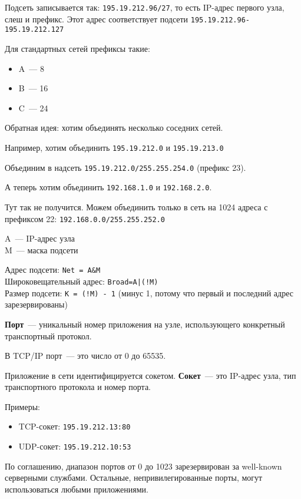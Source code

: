 Подсеть записывается так: {\tt 195.19.212.96/27}, то есть IP-адрес первого узла, слеш и префикс. Этот адрес соответствует подсети {\tt 195.19.212.96-195.19.212.127}

Для стандартных сетей префиксы такие:
\begin{itemize}
    \item A~--- 8
    \item B~--- 16
    \item C~--- 24
\end{itemize}


Обратная идея: хотим объединять несколько соседних сетей.

Например, хотим объединить {\tt 195.19.212.0} и {\tt 195.19.213.0}

Объединим в надсеть {\tt 195.19.212.0/255.255.254.0} (префикс 23).

А теперь хотим объединить {\tt 192.168.1.0} и {\tt 192.168.2.0}.

Тут так не получится. Можем объединить только в сеть на 1024 адреса с префиксом 22: {\tt 192.168.0.0/255.255.252.0}


A~--- IP-адрес узла\\
M~--- маска подсети

Адрес подсети: {\tt Net = A\&M}\\
Широковещательный адрес: {\tt Broad=A|(!M)}\\
Размер подсети: {\tt K = (!M) - 1} (минус 1, потому что первый и последний адрес зарезервированы)


{\bf Порт}~--- уникальный номер приложения на узле, использующего конкретный транспортный протокол.

В TCP/IP порт~--- это число от 0 до 65535.

Приложение в сети идентифицируется сокетом. {\bf Сокет}~--- это IP-адрес узла, тип транспортного протокола и номер порта.

Примеры:
\begin{itemize}
    \item TCP-сокет: {\tt 195.19.212.13:80}
    \item UDP-сокет: {\tt 195.19.212.10:53}
\end{itemize}

По соглашению, диапазон портов от 0 до 1023 зарезервирован за well-known серверными службами. Остальные, непривилегированные порты, могут использоваться любыми приложениями. 